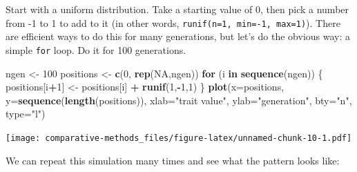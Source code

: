 \documentclass[]{article}
\newenvironment{Shaded}{\begin{snugshade}}{\end{snugshade}}
\newcommand{\ControlFlowTok}[1]{\textcolor[rgb]{0.13,0.29,0.53}{\textbf{#1}}}
\newcommand{\DataTypeTok}[1]{\textcolor[rgb]{0.13,0.29,0.53}{#1}}
\newcommand{\DecValTok}[1]{\textcolor[rgb]{0.00,0.00,0.81}{#1}}
\newcommand{\KeywordTok}[1]{\textcolor[rgb]{0.13,0.29,0.53}{\textbf{#1}}}
\newcommand{\NormalTok}[1]{#1}
\newcommand{\OperatorTok}[1]{\textcolor[rgb]{0.81,0.36,0.00}{\textbf{#1}}}
\newcommand{\OtherTok}[1]{\textcolor[rgb]{0.56,0.35,0.01}{#1}}
\newcommand{\StringTok}[1]{\textcolor[rgb]{0.31,0.60,0.02}{#1}}
\begin{document}
Start with a uniform distribution. Take a starting value of 0, then pick a number from -1 to 1 to add to it (in other words, \texttt{runif(n=1,\ min=-1,\ max=1)}). There are efficient ways to do this for many generations, but let's do the obvious way: a simple \texttt{for} loop. Do it for 100 generations.

\begin{Shaded}
\begin{Highlighting}[]
\NormalTok{ngen <-}\StringTok{ }\DecValTok{100}
\NormalTok{positions <-}\StringTok{ }\KeywordTok{c}\NormalTok{(}\DecValTok{0}\NormalTok{, }\KeywordTok{rep}\NormalTok{(}\OtherTok{NA}\NormalTok{,ngen))}
\ControlFlowTok{for}\NormalTok{ (i }\ControlFlowTok{in} \KeywordTok{sequence}\NormalTok{(ngen)) \{}
\NormalTok{  positions[i}\OperatorTok{+}\DecValTok{1}\NormalTok{] <-}\StringTok{ }\NormalTok{positions[i] }\OperatorTok{+}\StringTok{ }\KeywordTok{runif}\NormalTok{(}\DecValTok{1}\NormalTok{,}\OperatorTok{-}\DecValTok{1}\NormalTok{,}\DecValTok{1}\NormalTok{)}
\NormalTok{\}}
\KeywordTok{plot}\NormalTok{(}\DataTypeTok{x=}\NormalTok{positions, }\DataTypeTok{y=}\KeywordTok{sequence}\NormalTok{(}\KeywordTok{length}\NormalTok{(positions)), }\DataTypeTok{xlab=}\StringTok{"trait value"}\NormalTok{, }\DataTypeTok{ylab=}\StringTok{"generation"}\NormalTok{, }\DataTypeTok{bty=}\StringTok{"n"}\NormalTok{, }\DataTypeTok{type=}\StringTok{"l"}\NormalTok{)}
\end{Highlighting}
\end{Shaded}

\texttt{[image: comparative-methods\_files/figure-latex/unnamed-chunk-10-1.pdf]}

We can repeat this simulation many times and see what the pattern looks like:
\end{document}

